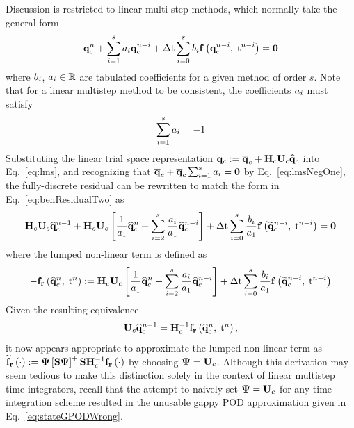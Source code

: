 Discussion is restricted to linear multi-step methods, which normally take the general form
%
\begin{equation}\label{eq:lms}
	\mathbf{q}_{c}^{n} + \sum_{i=1}^{s} a_{i} \mathbf{q}_{c}^{n-i} + \Delta \text{t} \sum_{i=0}^{s} b_{i} \mathbf{f} \left(\mathbf{q}_{c}^{n-i}, \; \text{t}^{n-i}\right) = \mathbf{0}
\end{equation}
%
where $b_{i}$, $a_{i} \in \mathbb{R}$ are tabulated coefficients for a given method of order $s$. Note that for a linear multistep method to be consistent, the coefficients $a_{i}$ must satisfy
%
\begin{equation}\label{eq:lmsNegOne}
	\sum_{i=1}^{s} a_{i} = -1
\end{equation}
%
Substituting the linear trial space representation $\consVec \defEq \consVecCent + \consScale \consTrial \consVecCoef$ into Eq.~\ref{eq:lms}, and recognizing that $\mathbf{\overline{q}}_{c} + \mathbf{\overline{q}}_{c} \sum_{i=1}^{s} a_{i} = \mathbf{0}$ by Eq.~\ref{eq:lmsNegOne}, the fully-discrete residual can be rewritten to match the form in Eq.~\ref{eq:benResidualTwo} as
%
\begin{equation}
	\consScale \consTrial \consVecCoef^{\timeIdx-1} + \consScale \consTrial \left[\frac{1}{a_1} \consVecCoef^{\timeIdx} + \sum_{\dummyIdx=2}^{s} \frac{a_{\dummyIdx}}{a_1} \consVecCoef^{\timeIdx-\dummyIdx}\right] + \dt \sum_{\dummyIdx=0}^{s} \frac{b_{\dummyIdx}}{a_1} \rhsFunc{\consVecRom^{\timeIdx-\dummyIdx}, \; \timeVar^{\timeIdx-\dummyIdx}} = \zeroVec
\end{equation}
%
where the lumped non-linear term is defined as
%
\begin{equation}
	-\rhsResFunc{\consVecCoef^{\timeIdx},\; \timeVar^{\timeIdx}} \defEq \consScale \consTrial \left[\frac{1}{a_1} \consVecCoef^{\timeIdx} + \sum_{\dummyIdx=2}^{s} \frac{a_{\dummyIdx}}{a_1} \consVecCoef^{\timeIdx-\dummyIdx}\right] + \dt \sum_{\dummyIdx=0}^{s} \frac{b_{\dummyIdx}}{a_1} \rhsFunc{\consVecRom^{\timeIdx-\dummyIdx}, \; \timeVar^{\timeIdx-\dummyIdx}}
\end{equation}
%
Given the resulting equivalence
%
\begin{equation}
	\consTrial \consVecCoef^{\timeIdx-1} = \consScaleInv \rhsResFunc{\consVecCoef^{\timeIdx},\; \timeVar^{\timeIdx}},
\end{equation}
%
it now appears appropriate to approximate the lumped non-linear term as $\rhsResApproxFunc{\cdot} \defEq \deimBasis \left[\sampMat \deimBasis\right]^+ \sampMat \consScaleInv \rhsResFunc{\cdot}$ by choosing $\deimBasis = \consTrial$. Although this derivation may seem tedious to make this distinction solely in the context of linear multistep time integrators, recall that the attempt to naively set $\deimBasis = \consTrial$ for any time integration scheme resulted in the unusable gappy POD approximation given in Eq.~\ref{eq:stateGPODWrong}.

